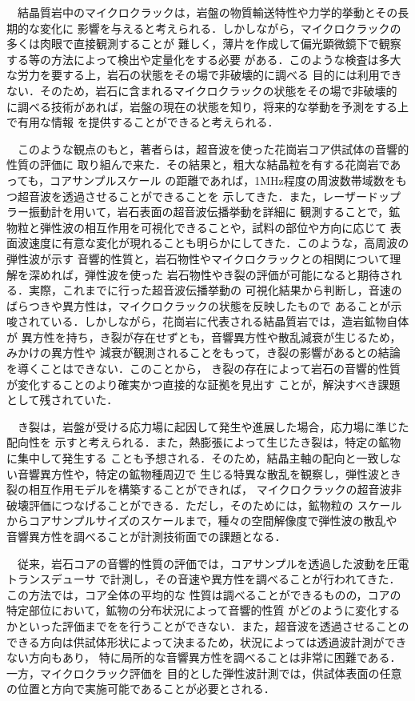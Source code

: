 ﻿　結晶質岩中のマイクロクラックは，岩盤の物質輸送特性や力学的挙動とその長期的な変化に
影響を与えると考えられる．しかしながら，マイクロクラックの多くは肉眼で直接観測することが
難しく，薄片を作成して偏光顕微鏡下で観察する等の方法によって検出や定量化をする必要
がある．このような検査は多大な労力を要する上，岩石の状態をその場で非破壊的に調べる
目的には利用できない．そのため，岩石に含まれるマイクロクラックの状態をその場で非破壊的
に調べる技術があれば，岩盤の現在の状態を知り，将来的な挙動を予測をする上で有用な情報
を提供することができると考えられる．

　このような観点のもと，著者らは，超音波を使った花崗岩コア供試体の音響的性質の評価に
取り組んで来た．その結果と，粗大な結晶粒を有する花崗岩であっても，コアサンプルスケール
の距離であれば，1MHz程度の周波数帯域数をもつ超音波を透過させることができることを
示してきた．また，レーザードップラー振動計を用いて，岩石表面の超音波伝播挙動を詳細に
観測することで，鉱物粒と弾性波の相互作用を可視化できることや，試料の部位や方向に応じて
表面波速度に有意な変化が現れることも明らかにしてきた．このような，高周波の弾性波が示す
音響的性質と，岩石物性やマイクロクラックとの相関について理解を深めれば，弾性波を使った
岩石物性やき裂の評価が可能になると期待される．実際，これまでに行った超音波伝播挙動の
可視化結果から判断し，音速のばらつきや異方性は，マイクロクラックの状態を反映したもので
あることが示唆されている．しかしながら，花崗岩に代表される結晶質岩では，造岩鉱物自体が
異方性を持ち，き裂が存在せずとも，音響異方性や散乱減衰が生じるため，みかけの異方性や
減衰が観測されることをもって，き裂の影響があるとの結論を導くことはできない．このことから，
き裂の存在によって岩石の音響的性質が変化することのより確実かつ直接的な証拠を見出す
ことが，解決すべき課題として残されていた．

　き裂は，岩盤が受ける応力場に起因して発生や進展した場合，応力場に準じた配向性を
示すと考えられる．また，熱膨張によって生じたき裂は，特定の鉱物に集中して発生する
ことも予想される．そのため，結晶主軸の配向と一致しない音響異方性や，特定の鉱物種周辺で
生じる特異な散乱を観察し，弾性波とき裂の相互作用モデルを構築することができれば，
マイクロクラックの超音波非破壊評価につなげることができる．ただし，そのためには，鉱物粒の
スケールからコアサンプルサイズのスケールまで，種々の空間解像度で弾性波の散乱や
音響異方性を調べることが計測技術面での課題となる．

　従来，岩石コアの音響的性質の評価では，コアサンプルを透過した波動を圧電トランスデューサ
で計測し，その音速や異方性を調べることが行われてきた．この方法では，コア全体の平均的な
性質は調べることができるものの，コアの特定部位において，鉱物の分布状況によって音響的性質
がどのように変化するかといった評価までをを行うことができない．また，超音波を透過させることの
できる方向は供試体形状によって決まるため，状況によっては透過波計測ができない方向もあり，
特に局所的な音響異方性を調べることは非常に困難である．一方，マイクロクラック評価を
目的とした弾性波計測では，供試体表面の任意の位置と方向で実施可能であることが必要とされる．

